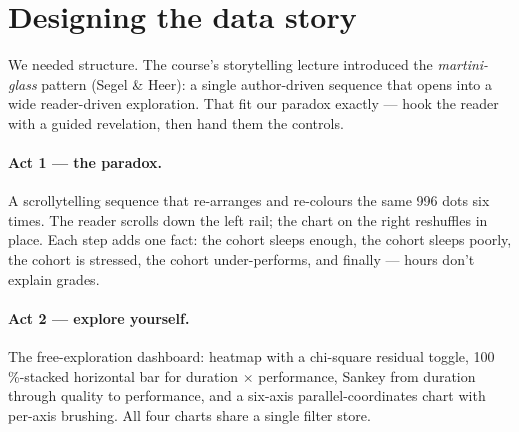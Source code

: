 \documentclass[11pt,a4paper]{article}
\begin{document}
\section{Designing the data story}
\label{sec:story}

We needed structure. The course's storytelling lecture introduced the \emph{martini-glass} pattern (Segel \& Heer): a single author-driven sequence that opens into a wide reader-driven exploration. That fit our paradox exactly — hook the reader with a guided revelation, then hand them the controls.

\begin{center}
\end{center}

\paragraph{Act 1 — the paradox.} A scrollytelling sequence that re-arranges and re-colours the same 996 dots six times. The reader scrolls down the left rail; the chart on the right reshuffles in place. Each step adds one fact: the cohort sleeps enough, the cohort sleeps poorly, the cohort is stressed, the cohort under-performs, and finally — hours don't explain grades.

\paragraph{Act 2 — explore yourself.} The free-exploration dashboard: heatmap with a chi-square residual toggle, 100\,\%-stacked horizontal bar for duration $\times$ performance, Sankey from duration through quality to performance, and a six-axis parallel-coordinates chart with per-axis brushing. All four charts share a single filter store.
\end{document}
